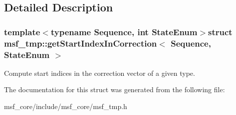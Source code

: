 \subsection{Detailed Description}
\subsubsection*{template$<$typename Sequence, int State\-Enum$>$struct msf\-\_\-tmp\-::get\-Start\-Index\-In\-Correction$<$ Sequence, State\-Enum $>$}

Compute start indices in the correction vector of a given type. 

The documentation for this struct was generated from the following file\-:\begin{DoxyCompactItemize}
\item 
msf\-\_\-core/include/msf\-\_\-core/msf\-\_\-tmp.\-h\end{DoxyCompactItemize}
